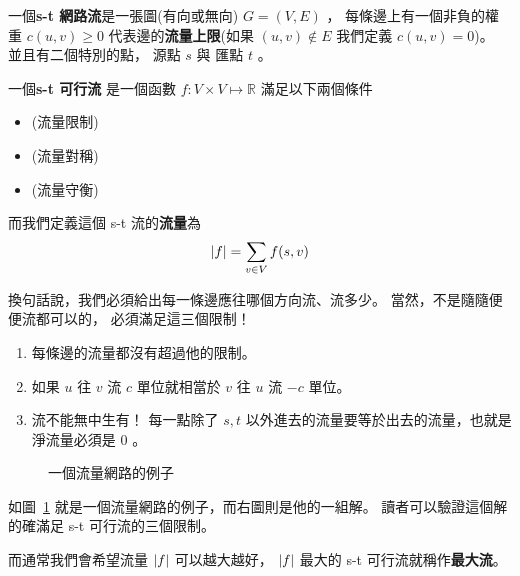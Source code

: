 \documentclass[a4paper,12pt]{book}
\begin{document}
\begin{theorem}[定義]
  一個{\bf s-t 網路流}是一張圖(有向或無向) $G = (V, E)$ ， 每條邊上有一個非負的權重
  $c(u, v) \geq 0$ 代表邊的{\bf 流量上限}(如果 $(u, v) \notin E$ 我們定義 $c(u, v) = 0$)。 
  並且有二個特別的點， 源點 $s$ 與 匯點 $t$ 。

  一個{\bf s-t 可行流} 是一個函數 $f : V \times V \mapsto \mathbb{R}$ 滿足以下兩個條件
  \begin{itemize}
    \item {}
      (流量限制)  \listeqn \label{def:flow1}
    \item {} 
      (流量對稱) \listeqn \label{def:flow1}
    \item {} 
      (流量守衡) \listeqn \label{def:flow1}
  \end{itemize}

  而我們定義這個 s-t 流的{\bf 流量}為 \[ \lvert f \rvert = \sum_{v \in V} f(s, v) \]
\end{theorem}

換句話說，我們必須給出每一條邊應往哪個方向流、流多少。 當然，不是隨隨便便流都可以的，
必須滿足這三個限制！

\begin{enumerate}[label=(1.\arabic*) :]
  \item 每條邊的流量都沒有超過他的限制。
  \item 如果 $u$ 往 $v$ 流 $c$ 單位就相當於 $v$ 往 $u$ 流 $-c$ 單位。
  \item 流不能無中生有！ 每一點除了 $s, t$ 以外進去的流量要等於出去的流量，也就是
    淨流量必須是 $0$ 。
\end{enumerate}


\begin{figure}[H]
  \centering
  
  \caption{一個流量網路的例子}
  \label{fig:flow1}
\end{figure}

如圖~\ref{fig:flow1} 就是一個流量網路的例子，而右圖則是他的一組解。
讀者可以驗證這個解的確滿足 s-t 可行流的三個限制。

而通常我們會希望流量 $\lvert f \rvert$ 可以越大越好， $\lvert f \rvert$ 最大的
s-t 可行流就稱作{\bf 最大流}。
\end{document}
